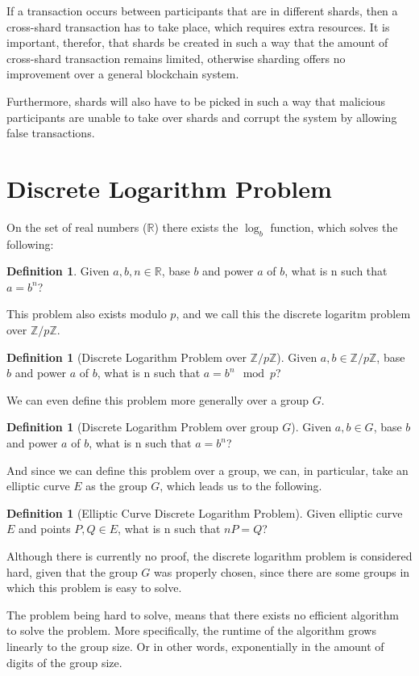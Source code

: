 \documentclass[12pt]{report}
\theoremstyle{plain}
\theoremstyle{definition}
\newtheorem{defn}[thm]{Definition} %
\begin{document}
	If a transaction occurs between participants that are in different shards, then a cross-shard transaction has to take place, which requires extra resources. It is important, therefor, that shards be created in such a way that the amount of cross-shard transaction remains limited, otherwise sharding offers no improvement over a general blockchain system.
	
	Furthermore, shards will also have to be picked in such a way that malicious participants are unable to take over shards and corrupt the system by allowing false transactions.\cite{omniledger}
	\section{Discrete Logarithm Problem}
	On the set of real numbers ($\mathbb{R}$) there exists the $\log_b$ function, which solves the following:
	\begin{defn}
		Given $a,b,n\in\mathbb{R}$, base $b$ and power $a$ of $b$, what is n such that $a=b^n$?
	\end{defn}
	This problem also exists modulo $p$, and we call this the discrete logaritm problem over $\mathbb{Z}/p\mathbb{Z}$.
	\begin{defn}[Discrete Logarithm Problem over $\mathbb{Z}/p\mathbb{Z}$]
		Given $a,b\in\mathbb{Z}/p\mathbb{Z}$, base $b$ and power $a$ of $b$, what is n such that $a=b^n\mod{p}$?
	\end{defn}
	We can even define this problem more generally over a group $G$.
	\begin{defn}[Discrete Logarithm Problem over group $G$]
		Given $a,b\in G$, base $b$ and power $a$ of $b$, what is n such that $a=b^n$?
	\end{defn}
	And since we can define this problem over a group, we can, in particular, take an elliptic curve $E$ as the group $G$, which leads us to the following.
	\begin{defn}[Elliptic Curve Discrete Logarithm Problem]
		Given elliptic curve $E$ and points $P,Q\in E$, what is n such that $nP=Q$?
	\end{defn}
	Although there is currently no proof, the discrete logarithm problem is considered hard, given that the group $G$ was properly chosen, since there are some groups in which this problem is easy to solve.
	
	The problem being hard to solve, means that there exists no efficient algorithm to solve the problem. More specifically, the runtime of the algorithm grows linearly to the group size. Or in other words, exponentially in the amount of digits of the group size.
	
\end{document}
